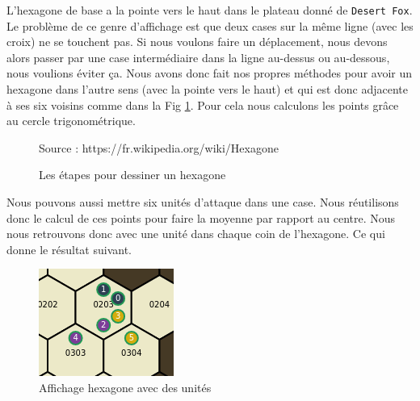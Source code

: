 L'hexagone de base a la pointe vers le haut dans le plateau donné de {\tt Desert Fox}.
Le problème de ce genre d'affichage est que deux cases sur la même ligne (avec les croix) ne se touchent pas. Si nous voulons faire un déplacement, nous devons alors passer par une case intermédiaire dans la ligne au-dessus ou au-dessous, nous voulions éviter ça. Nous avons donc fait nos propres méthodes pour avoir un hexagone dans l'autre sens (avec la pointe vers le haut) et qui est donc adjacente à ses six voisins comme dans la Fig \ref{fig:hexagon}. Pour cela nous calculons les points grâce au cercle trigonométrique.


\begin{figure}[H]
    \centering
    \def\stackalignment{r}
    {\scriptsize%
        Source : https://fr.wikipedia.org/wiki/Hexagone}
    \caption{Les étapes pour dessiner un hexagone}
    \label{fig:hexagon}
\end{figure}

Nous pouvons aussi mettre six unités d'attaque dans une case. Nous réutilisons donc le calcul de ces points pour faire la moyenne par rapport au centre. Nous nous retrouvons donc avec une unité dans chaque coin de l'hexagone. Ce qui donne le résultat suivant.

\begin{figure}[H]
    \centering
    \includegraphics[scale=.7]{data/hexagon_with_units.png}
    \caption{Affichage hexagone avec des unités}
    \label{fig:hexagon_with_units}
\end{figure}